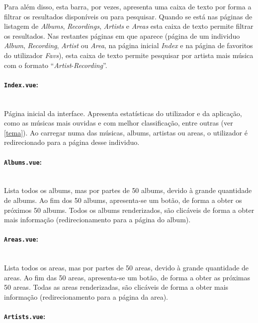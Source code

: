 \documentclass{article}
\begin{document}
Para além disso, esta barra, por vezes, apresenta uma caixa de texto por forma a filtrar os resultados disponíveis ou para pesquisar. Quando se está nas páginas de listagem de \textit{Albums}, \textit{Recordings}, \textit{Artists} e \textit{Areas} esta caixa de texto permite filtrar os resultados. Nas restantes páginas em que aparece (página de um individuo \textit{Album}, \textit{Recording}, \textit{Artist} ou \textit{Area}, na página inicial \textit{Index} e na página de favoritos do utilizador \textit{Favs}), esta caixa de texto permite pesquisar por artista mais música com o formato ``\textit{Artist}-\textit{Recording}''.

\paragraph{\texttt{Index.vue}:}\mbox{}\\

Página inicial da interface. Apresenta estatísticas do utilizador e da aplicação, como as músicas mais ouvidas e com melhor classificação, entre outras (ver \ref{tema}). Ao carregar numa das músicas, albums, artistas ou areas, o utilizador é redirecionado para a página desse individuo.

\paragraph{\texttt{Albums.vue}:}\mbox{}\\

Lista todos os albums, mas por partes de 50 albums, devido à grande quantidade de albums. Ao fim dos 50 albums, apresenta-se um botão, de forma a obter os próximos 50 albums. Todos os albums renderizados, são clicáveis de forma a obter mais informação (redirecionamento para a página do album).

\paragraph{\texttt{Areas.vue}:}\mbox{}\\

Lista todos os areas, mas por partes de 50 areas, devido à grande quantidade de areas. Ao fim das 50 areas, apresenta-se um botão, de forma a obter as próximas 50 areas. Todas as areas renderizadas, são clicáveis de forma a obter mais informação (redirecionamento para a página da area).

\paragraph{\texttt{Artists.vue}:}\mbox{}\\
\end{document}
